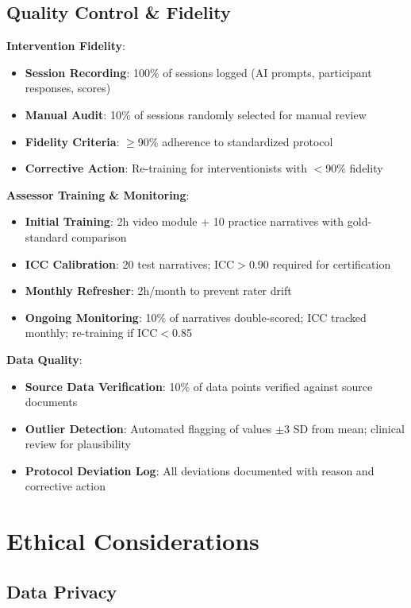 \documentclass[11pt]{article}
\begin{document}
\subsection{Quality Control \& Fidelity}

\textbf{Intervention Fidelity}:
\begin{itemize}
    \item \textbf{Session Recording}: 100\% of sessions logged (AI prompts, participant responses, scores)
    \item \textbf{Manual Audit}: 10\% of sessions randomly selected for manual review
    \item \textbf{Fidelity Criteria}: $\ge$90\% adherence to standardized protocol
    \item \textbf{Corrective Action}: Re-training for interventionists with $<$90\% fidelity
\end{itemize}

\textbf{Assessor Training \& Monitoring}:
\begin{itemize}
    \item \textbf{Initial Training}: 2h video module + 10 practice narratives with gold-standard comparison
    \item \textbf{ICC Calibration}: 20 test narratives; ICC$>$0.90 required for certification
    \item \textbf{Monthly Refresher}: 2h/month to prevent rater drift
    \item \textbf{Ongoing Monitoring}: 10\% of narratives double-scored; ICC tracked monthly; re-training if ICC$<$0.85
\end{itemize}

\textbf{Data Quality}:
\begin{itemize}
    \item \textbf{Source Data Verification}: 10\% of data points verified against source documents
    \item \textbf{Outlier Detection}: Automated flagging of values $\pm$3 SD from mean; clinical review for plausibility
    \item \textbf{Protocol Deviation Log}: All deviations documented with reason and corrective action
\end{itemize}

\section{Ethical Considerations}
\label{sec:ethics}

\subsection{Data Privacy}
\end{document}
